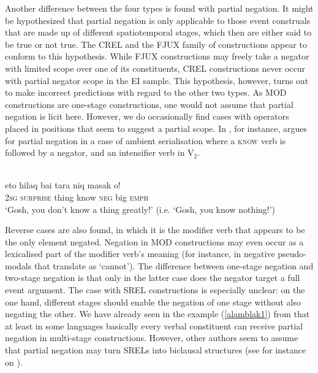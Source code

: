 Another difference between the four types is found with partial negation. It might be hypothesized that partial negation is only applicable to those event construals that are made up of different spatiotemporal stages, which then are either said to be true or not true. The CREL and the FJUX family of constructions appear to conform to this hypothesis. While FJUX constructions may freely take a negator with limited scope over one of its constituents, CREL constructions never occur with partial negator scope in the EI sample. This hypothesis, however, turns out to make incorrect predictions with regard to the other two types. As MOD constructions are one-stage constructions, one would not assume that partial negation is licit here. However, we do occasionally find cases with operators placed in positions that seem to suggest a partial scope. In , for instance, \citet[451]{schapper2009bunaq} argues for partial negation in a case of ambient serialisation where a \textsc{know} verb is followed by a negator, and an intensifier verb in V$_2$.

\ea 
{}\\
\gll eto hilaq bai tara niq masak o! \\
2\textsc{sg} \textsc{surprise} thing know \textsc{neg} big \textsc{emph} \\
\glft `Gosh, you don’t know a thing greatly!' (i.e. `Gosh, you know nothing!')\\ 
\z

Reverse cases are also found, in which it is the modifier verb that appears to be the only element negated. Negation in MOD constructions may even occur as a lexicalised part of the modifier verb's meaning (for instance, in negative pseudo-modals that translate as `cannot'). The difference between one-stage negation and two-stage negation is that only in the latter case does the negator target a full event argument. The case with SREL constructions is especially unclear: on the one hand, different stages should enable the negation of one stage without also negating the other. We have already seen in the  example (\ref{alamblak1}) from  that at least in some languages basically every verbal constituent can receive partial negation in multi-stage constructions. However, other authors seem to assume that partial negation may turn SRELs into biclausal structures (see for instance \citealt[184]{donohue1999} on ). 

